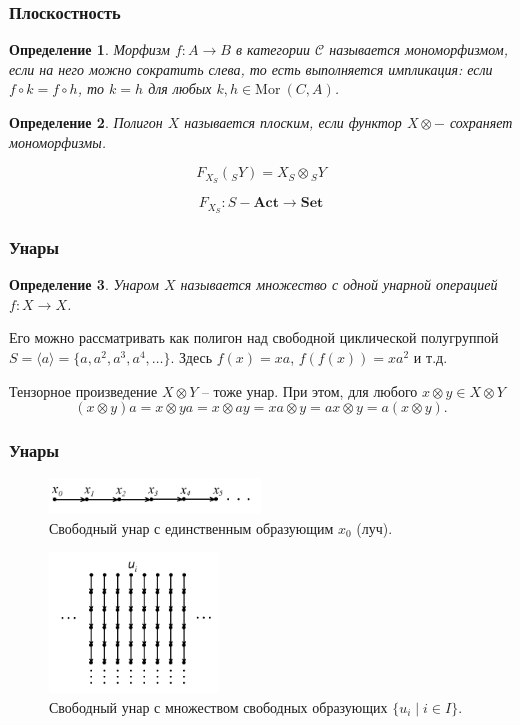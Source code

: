 \documentclass[11pt, notheorems]{beamer}
\newtheorem{definition}{Определение}
\begin{document}
\begin{frame}
	\frametitle{Плоскостность}

	\begin{definition}
		Морфизм $f: A \rightarrow B$ в категории $\mathcal{C}$ называется \textit{мономорфизмом}, если на него можно сократить слева, то есть выполняется импликация:
		если $f \circ k = f \circ h$, то $k = h$ для любых $k, h \in \mathrm{Mor} \ (C, A)$.
	\end{definition}

	\begin{definition}
		Полигон $X$ называется плоским, если функтор $X \otimes - $ сохраняет мономорфизмы.
	\end{definition}

	$$ F_{X_S} ({}_{S}Y) = X_S \otimes {}_{S}Y $$

	$$ F_{X_S}: S-\textbf{Act} \rightarrow \textbf{Set}$$
\end{frame}

\begin{frame}
	\frametitle{Унары}

	\begin{definition}
		Унаром $X$ называется множество с одной унарной операцией $f: X \rightarrow X$.
	\end{definition}

	Его можно рассматривать как полигон над свободной циклической полугруппой $S = \langle a \rangle = \{ a, a^2, a^3, a^4, \ldots \}$.
	Здесь $f(x) = xa$, $f(f(x)) = x a^2$ и т.д.

	\pause
	\vspace{0.5cm}

	Тензорное произведение $ X \otimes Y $ -- тоже унар.
	При этом, для любого $x \otimes y \in X \otimes Y$
	\[
		(x \otimes y) a = x \otimes ya = x \otimes a y = xa \otimes y = ax \otimes y = a (x \otimes y).
	\]
\end{frame}

\begin{frame}
	\frametitle{Унары}

	\begin{figure}
		\center
		\includegraphics[width=0.5\textwidth]{free_unar_1}
		\caption{Свободный унар с единственным образующим $x_0$ (луч).}
	\end{figure}

	\begin{figure}
		\center
		\includegraphics[width=0.4\textwidth]{free_unar_2}
		\caption{Свободный унар с множеством свободных образующих $\{ u_i \mid i \in I \}$.}
	\end{figure}
\end{frame}
\end{document}
